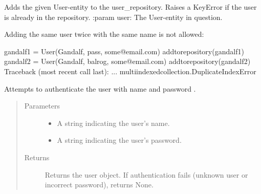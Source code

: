 \documentclass[letterpaper,10pt,english]{sphinxmanual}
\begin{document}
\begin{fulllineitems}
\label{\detokenize{pydash_app.user:pydash_app.user.add_to_repository}}
Adds the given User-entity to the user\_repository. Raises a KeyError if the user is already in the repository.
:param user: The User-entity in question.

Adding the same user twice with the same name is not allowed:

%
\begin{sphinxVerbatim}[commandchars=\\\{\}]
\PYGZgt{}\PYGZgt{}\PYGZgt{} gandalf1 = User(\PYGZdq{}Gandalf\PYGZdq{}, \PYGZdq{}pass\PYGZdq{}, \PYGZsq{}some@email.com\PYGZsq{})
\PYGZgt{}\PYGZgt{}\PYGZgt{} add\PYGZus{}to\PYGZus{}repository(gandalf1)
\PYGZgt{}\PYGZgt{}\PYGZgt{} gandalf2 = User(\PYGZdq{}Gandalf\PYGZdq{}, \PYGZdq{}balrog\PYGZdq{}, \PYGZsq{}some@email.com\PYGZsq{})
\PYGZgt{}\PYGZgt{}\PYGZgt{} add\PYGZus{}to\PYGZus{}repository(gandalf2)
Traceback (most recent call last):
  ...
multi\PYGZus{}indexed\PYGZus{}collection.DuplicateIndexError
\end{sphinxVerbatim}

\end{fulllineitems}


\begin{fulllineitems}
\label{\detokenize{pydash_app.user:pydash_app.user.authenticate}}
Attempts to authenticate the user with name 
and password .
\begin{quote}\begin{description}
\item[{Parameters}] \leavevmode\begin{itemize}
\item {} 
 \textendash{} A string indicating the user’s name.

\item {} 
 \textendash{} A string indicating the user’s password.

\end{itemize}

\item[{Returns}] \leavevmode
Returns the user object. If authentication fails (unknown user or incorrect password), returns None.

\end{description}\end{quote}

\end{fulllineitems}
\end{document}
